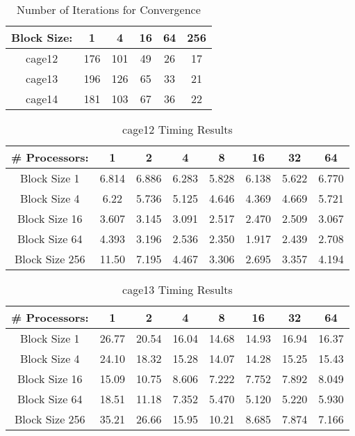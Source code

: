 \documentclass[pageno]{jpaper}
\begin{document}
\begin{doublespacing}
\begin{table}[h!]
\centering
\begin{tabular}{|c|c|c|c|c|c|}
\hline
Block Size: & 1 & 4 & 16 & 64 & 256 \\ \hline
cage12 & 176 & 101 & 49 & 26 & 17 \\ \hline
cage13 & 196 & 126 & 65 & 33 & 21 \\ \hline
cage14 & 181 & 103 & 67 & 36 & 22 \\ \hline
\end{tabular}
\label{table:4}
\caption{Number of Iterations for Convergence}
\end{table}

\begin{table}[h!]
\centering
\begin{tabular}{|c|c|c|c|c|c|c|c|}
\hline
\# Processors: & 1 & 2 & 4 & 8 & 16 & 32 & 64 \\ \hline
Block Size 1 & 6.814 & 6.886 & 6.283 & 5.828 & 6.138 & 5.622 & 6.770 \\ \hline
Block Size 4 & 6.22 & 5.736 & 5.125 & 4.646 & 4.369 & 4.669 & 5.721 \\ \hline
Block Size 16 & 3.607 & 3.145 & 3.091 & 2.517 & 2.470 & 2.509 & 3.067 \\ \hline
Block Size 64 & 4.393 & 3.196 & 2.536 & 2.350 & 1.917 & 2.439 & 2.708 \\ \hline
Block Size 256 & 11.50 & 7.195 & 4.467 & 3.306 & 2.695 & 3.357 & 4.194 \\ \hline
\end{tabular}
\label{table:5}
\caption{cage12 Timing Results}
\end{table}

\begin{table}[h!]
\centering
\begin{tabular}{|c|c|c|c|c|c|c|c|}
\hline
\# Processors: & 1 & 2 & 4 & 8 & 16 & 32 & 64 \\ \hline
Block Size 1 & 26.77 & 20.54 & 16.04 & 14.68 & 14.93 & 16.94 & 16.37 \\ \hline
Block Size 4 & 24.10 & 18.32 & 15.28 & 14.07 & 14.28 & 15.25 & 15.43 \\ \hline
Block Size 16 & 15.09 & 10.75 & 8.606 & 7.222 & 7.752 & 7.892 & 8.049 \\ \hline
Block Size 64 & 18.51 & 11.18 & 7.352 & 5.470 & 5.120 & 5.220 & 5.930 \\ \hline
Block Size 256 & 35.21 & 26.66 & 15.95 & 10.21 & 8.685 & 7.874 & 7.166 \\ \hline
\end{tabular}
\label{table:6}
\caption{cage13 Timing Results}
\end{table}


\end{doublespacing}
\end{document}
